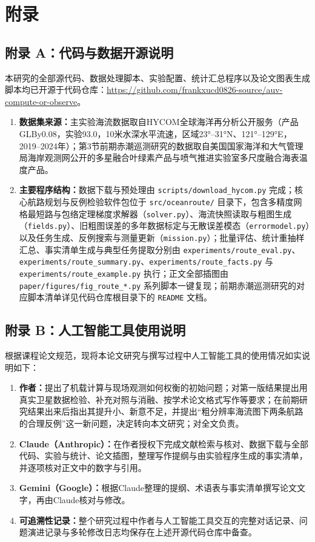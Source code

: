 \section*{附录}

\subsection*{附录 A：代码与数据开源说明}
本研究的全部源代码、数据处理脚本、实验配置、统计汇总程序以及论文图表生成脚本均已开源于代码仓库：\url{https://github.com/frankxucd0826-source/auv-compute-or-observe}。

\begin{enumerate}
    \item \textbf{数据集来源：}主实验海流数据取自HYCOM全球海洋再分析公开服务（产品GLBy0.08，实验93.0，10米水深水平流速，区域23°--31°N、121°--129°E，2019--2024年）；第3节前期赤潮巡测研究的数据取自美国国家海洋和大气管理局海岸观测网公开的多星融合叶绿素产品与喷气推进实验室多尺度融合海表温度产品。
    \item \textbf{主要程序结构：}数据下载与预处理由 \texttt{scripts/download\_hycom.py} 完成；核心航路规划与反例检验软件包位于 \texttt{src/oceanroute/} 目录下，包含多精度网格最短路与包络定理梯度求解器（\texttt{solver.py}）、海流快照读取与粗图生成（\texttt{fields.py}）、旧粗图误差的多年数据标定与无散误差模态（\texttt{errormodel.py}）以及任务生成、反例搜索与测量更新（\texttt{mission.py}）；批量评估、统计重抽样汇总、事实清单生成与典型任务提取分别由 \texttt{experiments/route\_eval.py}、\texttt{experiments/route\_summary.py}、\texttt{experiments/route\_facts.py} 与 \texttt{experiments/route\_example.py} 执行；正文全部插图由 \texttt{paper/figures/fig\_route\_*.py} 系列脚本一键复现；前期赤潮巡测研究的对应脚本清单详见代码仓库根目录下的 \texttt{README} 文档。
\end{enumerate}

\subsection*{附录 B：人工智能工具使用说明}
根据课程论文规范，现将本论文研究与撰写过程中人工智能工具的使用情况如实说明如下：
\begin{enumerate}
    \item \textbf{作者：}提出了机载计算与现场观测如何权衡的初始问题；对第一版结果提出用真实卫星数据检验、补充对照与消融、按学术论文格式写作等要求；在前期研究结果出来后指出其提升小、新意不足，并提出“粗分辨率海流图下两条航路的合理反例”这一新问题，决定转向本文研究；对全文负责。
    \item \textbf{Claude（Anthropic）：}在作者授权下完成文献检索与核对、数据下载与全部代码、实验与统计、论文插图，整理写作提纲与由实验程序生成的事实清单，并逐项核对正文中的数字与引用。
    \item \textbf{Gemini（Google）：}根据Claude整理的提纲、术语表与事实清单撰写论文文字，再由Claude核对与修改。
    \item \textbf{可追溯性记录：}整个研究过程中作者与人工智能工具交互的完整对话记录、问题演进记录与多轮修改日志均保存在上述开源代码仓库中备查。
\end{enumerate}
